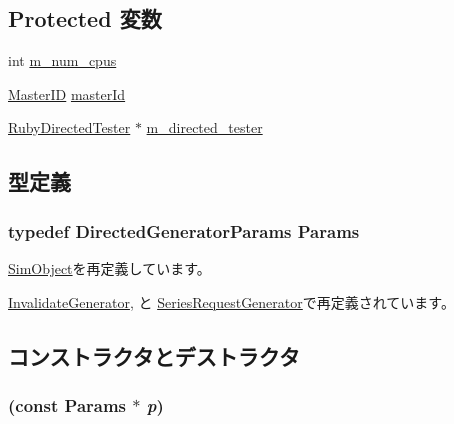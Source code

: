 \subsection*{Protected 変数}
\begin{DoxyCompactItemize}
\item 
int \hyperlink{classDirectedGenerator_a696a7ada843596770ab04a749b5ffd67}{m\_\-num\_\-cpus}
\item 
\hyperlink{request_8hh_ac366b729262fd8e7cbd3283da6f775cf}{MasterID} \hyperlink{classDirectedGenerator_a96ec6a422ac492d05f8b3edc5b58532b}{masterId}
\item 
\hyperlink{classRubyDirectedTester}{RubyDirectedTester} $\ast$ \hyperlink{classDirectedGenerator_a29e21ffbcddccebb0466d6e25b3149ca}{m\_\-directed\_\-tester}
\end{DoxyCompactItemize}


\subsection{型定義}
\hypertarget{classDirectedGenerator_ac723463fca65df4ca9fb4e67caddf417}{
\subsubsection[{Params}]{\setlength{\rightskip}{0pt plus 5cm}typedef DirectedGeneratorParams {\bf Params}}}
\label{classDirectedGenerator_ac723463fca65df4ca9fb4e67caddf417}


\hyperlink{classSimObject_a0f0761d2db586a23bb2a2880b8f387bb}{SimObject}を再定義しています。

\hyperlink{classInvalidateGenerator_ad11a79a813ce545d94f4464bebc395eb}{InvalidateGenerator}, と \hyperlink{classSeriesRequestGenerator_a0f1dfc608e63d6aef0930883cc174b42}{SeriesRequestGenerator}で再定義されています。

\subsection{コンストラクタとデストラクタ}
\hypertarget{classDirectedGenerator_af37b4a52922bc83f0c89a14542f01adf}{
\subsubsection[{DirectedGenerator}]{ (const {\bf Params} $\ast$ {\em p})}}
\label{classDirectedGenerator_af37b4a52922bc83f0c89a14542f01adf}



